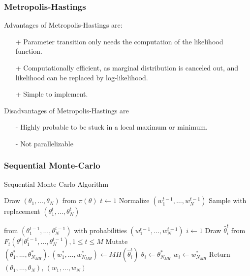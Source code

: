 \documentclass{beamer}
\makeatletter
\def\NoNumber#1{{\def\alglinenumber##1{}\State #1}\addtocounter{ALG@line}{-1}}
\makeatother
\begin{document}
\begin{frame}
    \frametitle{Metropolis-Hastings}
    Advantages of Metropolis-Hastings are:
    \begin{itemize}
        \item[+] Parameter transition only needs the computation of the likelihood function.
        \item[+] Computationally efficient, as marginal distribution is canceled out, and likelihood can
              be replaced by log-likelihood.
        \item[+] Simple to implement.
    \end{itemize}
    Disadvantages of Metropolis-Hastings are
    \begin{enumerate}
        \item[-] Highly probable to be stuck in a local maximum or minimum.
        \item[-] Not parallelizable
    \end{enumerate}
\end{frame}

\begin{frame}
    \frametitle{Sequential Monte-Carlo}
    \footnotesize{
        \begin{algorithm}[H]
            \caption{Sequential Monte Carlo Algorithm}
            \label{alg:smc}
            \begin{algorithmic}[1]
                \State Draw $(\theta_1,\ldots,\theta_N)$ from $\pi(\theta)$ 
                \State $t \leftarrow 1$
                \State Normalize $(w^{t-1}_1,\ldots,w^{t-1}_N)$  
                \State Sample with replacement $(\theta^t_1,\ldots,\theta^t_N)$ 
                \NoNumber{\hspace{.5cm}} from $(\theta^{t-1}_1,\ldots,\theta^{t-1}_N)$ with probabilities $(w^{t-1}_1,\ldots,w^{t-1}_N)$
                \State $i \leftarrow 1$
                 
                \State Draw $\hat{\theta}^t_i$ from $F_t(\theta^t | \theta^{t-1}_1,\ldots,\theta^{t-1}_N), 1\leq t \leq M$
                \State Mutate $(\theta^*_1,\ldots,\theta^*_{N_{MH}}), (w^*_1,\ldots,w^*_{N_{MH}}) \leftarrow MH(\hat{\theta}^t_i)$
                \State $\theta_i \leftarrow \theta^*_{N_{MH}}$
                \State $w_i \leftarrow w^*_{N_{MH}}$
                \EndWhile
                \EndWhile
                \State Return $(\theta_1,\ldots,\theta_{N})$, $(w_1,\ldots,w_{N})$
                \EndProcedure
            \end{algorithmic}
        \end{algorithm}
    }
\end{frame}
\end{document}
